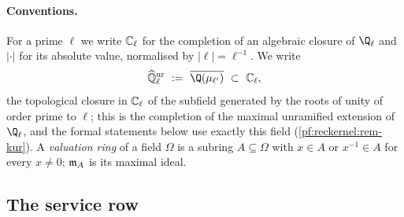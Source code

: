 \paragraph{Conventions.}
For a prime $\ell$ we write $\mathbb{C}_\ell$ for the completion of an algebraic closure of $\Q_\ell$ and $|\cdot|$ for
its absolute value, normalised by $|\ell|=\ell^{-1}$. We write
\[
\reckKur\ :=\ \overline{\Q(\mu_{\ell'})}\ \subset\ \reckCl,
\]
the topological closure in $\mathbb{C}_\ell$ of the subfield generated by the roots of unity of order prime to $\ell$;
this is the completion of the maximal unramified extension of $\Q_\ell$, and the formal statements below use
exactly this field (\cref{pf:reckernel:rem-kur}). A \emph{valuation ring} of a field $\Omega$ is a subring
$A\subseteq\Omega$ with $x\in A$ or $x^{-1}\in A$ for every $x\ne0$; $\mathfrak{m}_A$ is its maximal ideal.

\subsection{The service row}\label{pf:reckernel:sec-row}

